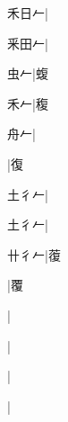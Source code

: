 \begin{multicols}{2}
{{\cjk{}禾日{\cnxHanaA{}𠂉}}|{}\par
{\cjk{}釆田{\cnxHanaA{}𠂉}}|{}\par
{\cjk{}{\cnsym{}　}虫{\cnxHanaA{}𠂉}}|{\cjk{}蝮}\par
{\cjk{}{\cnsym{}　}禾{\cnxHanaA{}𠂉}}|{\cjk{}稪}\par
{\cjk{}{\cnsym{}　}舟{\cnxHanaA{}𠂉}}|{}\par
{}|{\cjk{}復}\par
{\cjk{}土{彳}{\cnxHanaA{}𠂉}}|{}\par
{\cjk{}土{彳}{\cnxHanaA{}𠂉}}|{}\par
{\cjk{}卄{彳}{\cnxHanaA{}𠂉}}|{\cjk{}蕧}\par
{}|{\cjk{}覆}\par
{}|{}\par
{}|{}\par
{}|{}\par
{}|{}\par
}
\end{multicols}

